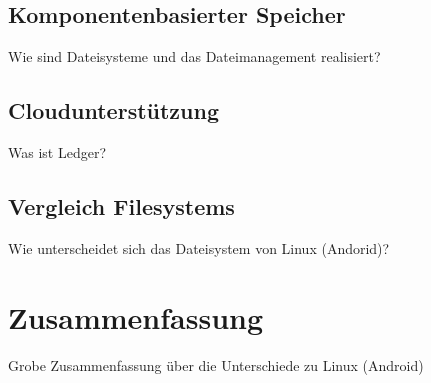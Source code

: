 \documentclass[a4paper]{scrartcl}
\begin{document}
\subsection{Komponentenbasierter Speicher}
Wie sind Dateisysteme und das Dateimanagement realisiert?
\subsection{Cloudunterstützung}
Was ist Ledger?
\subsection{Vergleich Filesystems}
Wie unterscheidet sich das Dateisystem von Linux (Andorid)?
\section{Zusammenfassung}
Grobe Zusammenfassung über die Unterschiede zu Linux (Android)



\end{document}

